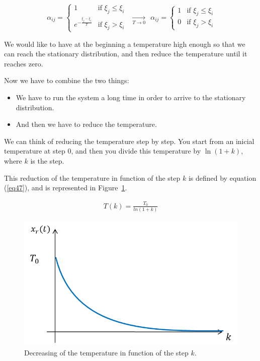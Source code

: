$$
\ \alpha_{ij} = 
\begin{cases}
1  & \mbox{if } \xi_{j} \leq \xi_{i}\\ 
e^{-\frac{\xi_{j}-\xi_{i}}{T}} & \mbox{if }\xi_{j} > \xi_{i}
\end{cases} 
\ \ \xrightarrow[T\to 0]{} \ \ 
\alpha_{ij} = 
\begin{cases}
1  & \mbox{if } \xi_{j} \leq \xi_{i}\\ 
0 & \mbox{if }\xi_{j} > \xi_{i}
\end{cases} 
$$

We would like to have at the beginning a temperature high enough so that we can reach the stationary distribution, and then reduce the temperature until it reaches zero.

Now we have to combine the two things:

\begin{itemize}
\item We have to run the system a long time in order to arrive to the stationary distribution.
\item And then we have to reduce the temperature.
\end{itemize}

We can think of reducing the temperature step by step. 
You start from an inicial temperature at step 0, and then you divide this temperature by $\ln(1+k)$, where $k$ is the step.

This reduction of the temperature in function of the step $k$ is defined by equation (\ref{eq47}), and is represented in Figure~\ref{figur16}.

\begin{equation}
\begin{aligned}
T(k) = \frac{T_0}{ln (1+k)}
\end{aligned}
\label{eq47}
\end{equation}

\begin{figure}[h!]
\centering
\includegraphics[scale=.7]{logDecreasingTemperature}
\caption{Decreasing of the temperature in function of the step $k$.}
\label{figur16}
\end{figure}

